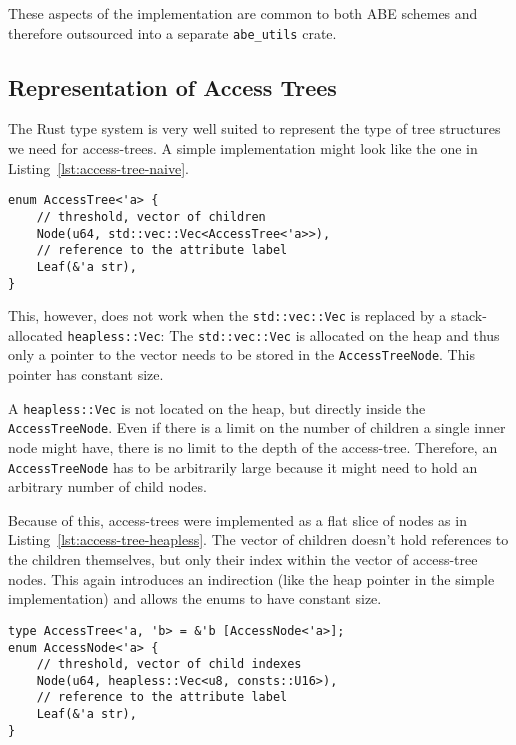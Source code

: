 These aspects of the implementation are common to both ABE schemes and therefore outsourced into a separate \verb+abe_utils+ crate.

\subsection{Representation of Access Trees}
The Rust type system is very well suited to represent the type of tree structures we need for \glspl{access-tree}.
A simple implementation might look like the one in Listing~\ref{lst:access-tree-naive}. 

\begin{lstlisting}[float=h,caption={Simple Implementation of \glspl{access-tree} (using the standard library)},label={lst:access-tree-naive}]
enum AccessTree<'a> {
    // threshold, vector of children
    Node(u64, std::vec::Vec<AccessTree<'a>>),
    // reference to the attribute label
    Leaf(&'a str),
}
\end{lstlisting}

This, however, does not work when the \texttt{std::vec::Vec} is replaced by a stack-allocated \texttt{heapless::Vec}:
The \texttt{std::vec::Vec} is allocated on the heap and thus only a pointer to the vector needs to be stored in the \texttt{AccessTreeNode}.
This pointer has constant size.

A \texttt{heapless::Vec} is not located on the heap, but directly inside the \texttt{AccessTreeNode}.
Even if there is a limit on the number of children a single inner node might have, there is no limit to the depth of the \gls{access-tree}.
Therefore, an \texttt{AccessTreeNode} has to be arbitrarily large because it might need to hold an arbitrary number of child nodes.

Because of this, \glspl{access-tree} were implemented as a flat slice of nodes as in Listing~\ref{lst:access-tree-heapless}. 
The vector of children doesn't hold references to the children themselves, but only their index within the vector of \gls{access-tree} nodes.
This again introduces an indirection (like the heap pointer in the simple implementation) and allows the enums to have constant size.

\begin{lstlisting}[float=h,caption={Refined implementation of \glspl{access-tree} (works without standard library)},label={lst:access-tree-heapless}]
type AccessTree<'a, 'b> = &'b [AccessNode<'a>];
enum AccessNode<'a> {
    // threshold, vector of child indexes
    Node(u64, heapless::Vec<u8, consts::U16>),
    // reference to the attribute label
    Leaf(&'a str),
}
\end{lstlisting}

